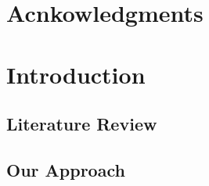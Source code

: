 \documentclass[12pt]{article} %
\numberwithin{equation}{subsection}
\begin{document}
\newpage
\tableofcontents

\newpage

\section*{Acnkowledgments}


\newpage

\section{Introduction}\label{intro}








\subsection{Literature Review}




\subsection{Our Approach}
\end{document}
